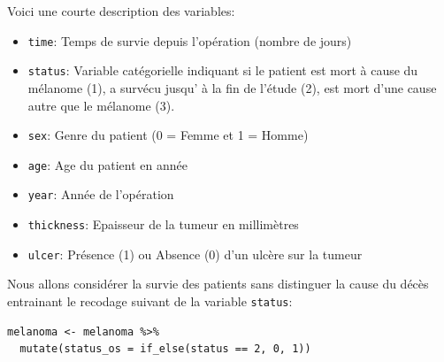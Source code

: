 \documentclass[11pt, addpoints, answers]{exam}
\begin{document}
\begin{questions}
Voici une courte description des variables:
\begin{itemize}
  \item \texttt{time}: Temps de survie depuis l'opération (nombre de jours) 
  \item \texttt{status}: Variable catégorielle indiquant si le patient est mort à cause du mélanome (1), a survécu jusqu' à la fin de l'étude (2), est mort d'une cause autre que le mélanome (3). 
  \item \texttt{sex}: Genre du patient (0 = Femme et 1 = Homme) 
  \item \texttt{age}: Age du patient en année
  \item \texttt{year}: Année de l'opération 
  \item \texttt{thickness}: Epaisseur de la tumeur en millimètres
  \item \texttt{ulcer}: Présence (1) ou Absence (0) d'un ulcère sur la tumeur
\end{itemize}

Nous allons considérer la survie des patients sans distinguer la cause du décès entrainant le recodage suivant de la variable \texttt{status}:
\begin{lstlisting}
melanoma <- melanoma %>%
  mutate(status_os = if_else(status == 2, 0, 1))
\end{lstlisting}
\begin{parts}

\end{parts}
\end{questions}
\end{document}
